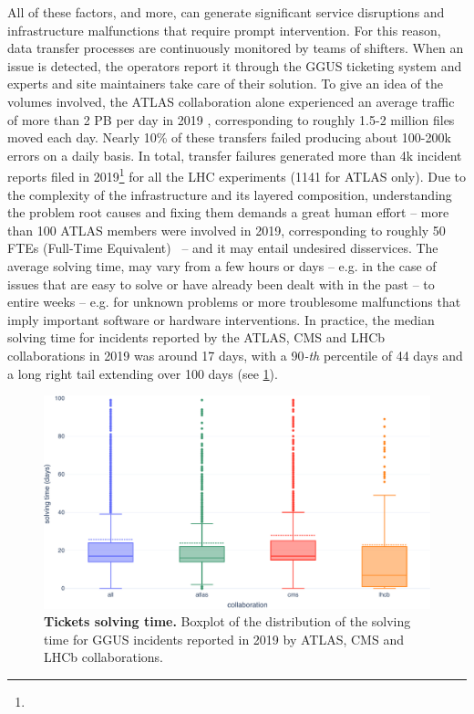 All of these factors, and more, can generate significant service disruptions and infrastructure malfunctions that require prompt intervention.
For this reason, data transfer processes are continuously monitored by teams of shifters. When an issue is detected, the operators report it through the GGUS ticketing system \cite{antoni2008ggus} and experts and site maintainers take care of their solution.
To give an idea of the volumes involved, the ATLAS collaboration alone experienced an average traffic of more than 2 PB per day in 2019 \cite{calafiura2020design_report}, corresponding to roughly 1.5-2 million files moved each day.
Nearly 10\% of these transfers failed producing about 100-200k errors on a daily basis. 
In total, transfer failures generated more than 4k incident reports filed in 2019\footnote{\ggus} for all the LHC experiments (1141 for ATLAS only).
Due to the complexity of the infrastructure and its layered composition, understanding the problem root causes and fixing them demands a great human effort -- more than 100 ATLAS members were involved in 2019, corresponding to roughly 50 FTEs (Full-Time Equivalent)~\cite{jarka2019ftes} -- and it may entail undesired disservices.
The average solving time, may vary from a few hours or days -- e.g. in the case of issues that are easy to solve or have already been dealt with in the past -- to entire weeks -- e.g. for unknown problems or more troublesome malfunctions that imply important software or hardware interventions.
In practice, the median solving time for incidents reported by the ATLAS, CMS and LHCb collaborations in 2019 was around 17 days, with a 90\textit{-th} percentile of 44 days and a long right tail extending over 100 days (see \cref{fig:ggus_time}).
\begin{figure}
    \centering
    \includegraphics[width=\textwidth]{figures/220_introduction/GGUS_time.pdf}
    \caption{\textbf{Tickets solving time.} Boxplot of the distribution of the solving time for GGUS incidents reported in 2019 by ATLAS, CMS and LHCb collaborations.}
    \label{fig:ggus_time}
\end{figure}
